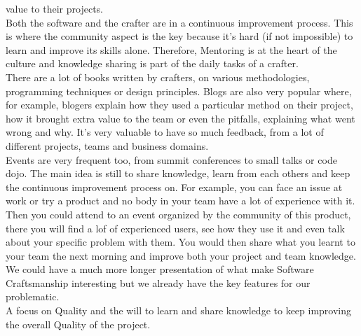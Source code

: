 value to their projects.\\
\newline
Both the software and the crafter are in a continuous improvement process.
This is where the community aspect is the key because it's hard (if not
impossible) to learn and improve its skills alone.
Therefore, Mentoring is at the heart of the culture and knowledge
sharing is part of the daily tasks of a crafter. \\
\newline
There are a lot of books written by crafters, on various methodologies,
programming techniques or design principles.
Blogs are also very popular where, for example, blogers explain how they
used a particular method on their project, how it brought extra value to
the team or even the pitfalls, explaining what went wrong and why.
It's very valuable to have so much feedback, from a lot of different
projects, teams and business domains. \\
\newline
Events are very frequent too, from summit conferences to small talks or
code dojo.
The main idea is still to share knowledge, learn from each others and keep
the continuous improvement process on.
For example, you can face an issue at work or try a product and no body
in your team have a lot of experience with it.
Then you could attend to an event organized by the community of this
product, there you will find a lof of experienced users, see how they
use it and even talk about your specific problem with them.
You would then share what you learnt to your team the next morning and
improve both your project and team knowledge. \\
\newline
We could have a much more longer presentation of what make Software
Craftsmanship interesting but we already have the key features for
our problematic. \\
A focus on Quality and the will to learn and share knowledge to keep
improving the overall Quality of the project.
